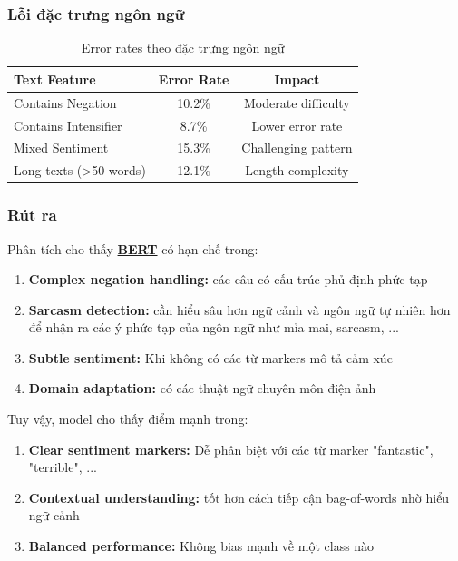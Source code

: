 \subsubsection{Lỗi đặc trưng ngôn ngữ}

\begin{table}[H]
\centering
\caption{Error rates theo đặc trưng ngôn ngữ}
\label{tab:linguistic_error_patterns}
\begin{tabular}{lcc}
\toprule
\textbf{Text Feature} & \textbf{Error Rate} & \textbf{Impact} \\
\midrule
Contains Negation & 10.2\% & Moderate difficulty \\
Contains Intensifier & 8.7\% & Lower error rate \\
Mixed Sentiment & 15.3\% & Challenging pattern \\
Long texts (>50 words) & 12.1\% & Length complexity \\
\bottomrule
\end{tabular}
\end{table}

\subsubsection{Rút ra}

Phân tích cho thấy \hyperref[acro:bert]{\textbf{BERT}} có hạn chế trong:

\begin{enumerate}
    \item \textbf{Complex negation handling:} các câu có cấu trúc phủ định phức tạp
    \item \textbf{Sarcasm detection:} cần hiểu sâu hơn ngữ cảnh và ngôn ngữ tự nhiên hơn để nhận ra các ý phức tạp của ngôn ngữ như mỉa mai, sarcasm, ...
    \item \textbf{Subtle sentiment:} Khi không có các từ markers mô tả cảm xúc
    \item \textbf{Domain adaptation:} có các thuật ngữ chuyên môn điện ảnh
\end{enumerate}

Tuy vậy, model cho thấy điểm mạnh trong:
\begin{enumerate}
    \item \textbf{Clear sentiment markers:} Dễ phân biệt với các từ marker "fantastic", "terrible", ...
    \item \textbf{Contextual understanding:} tốt hơn cách tiếp cận bag-of-words nhờ hiểu ngữ cảnh   
    \item \textbf{Balanced performance:} Không bias mạnh về một class nào
\end{enumerate}

